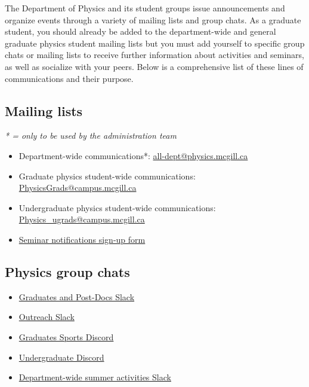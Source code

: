 The Department of Physics and its student groups issue announcements and organize events through a variety of mailing lists and group chats. As a graduate student, you should already be added to the department-wide and general graduate physics student mailing lists but you must add yourself to specific group chats or mailing lists to receive further information about activities and seminars, as well as socialize with your peers. Below is a comprehensive list of these lines of communications and their purpose.

\subsection*{Mailing lists}

\noindent\textit{* = only to be used by the administration team}

\begin{itemize}
    \item Department-wide communications*: 
    \href{mailto:all-dept@physics.mcgill.ca}{all-dept@physics.mcgill.ca}

    \item Graduate physics student-wide communications: 
    \href{mailto:PhysicsGrads@campus.mcgill.ca}{PhysicsGrads@campus.mcgill.ca}

    \item Undergraduate physics student-wide communications: 
    \href{mailto:Physics_ugrads@campus.mcgill.ca}{Physics\_ugrads@campus.mcgill.ca}

    \item \href{https://www.physics.mcgill.ca/seminars/sem_lists.html}{Seminar notifications sign-up form}
\end{itemize}

\subsection*{Physics group chats}

\begin{itemize}
    \item \href{https://mcgillphysics-rag1431.slack.com/join/shared_invite/zt-3vlrg6luf-k0KqSG3LdCQ2V2P96XF_kQ}{Graduates and Post-Docs Slack}

    \item \href{https://join.slack.com/t/physoutreachv-8w11821/shared_invite/zt-46ado9t80-6DSn~Wb26pX5CK_io4bFZQ}{Outreach Slack}

    \item \href{https://discord.gg/6CQgQrdNrZ}{Graduates Sports Discord}

    \item \href{https://discord.gg/BEXgQhSnHJ}{Undergraduate Discord}

    \item \href{https://join.slack.com/t/mcgillphysics-jns2249/shared_invite/zt-3xqtkfyt0-kcsvyuS8yKqqAEUud70Vsg}{Department-wide summer activities Slack}
\end{itemize}

    